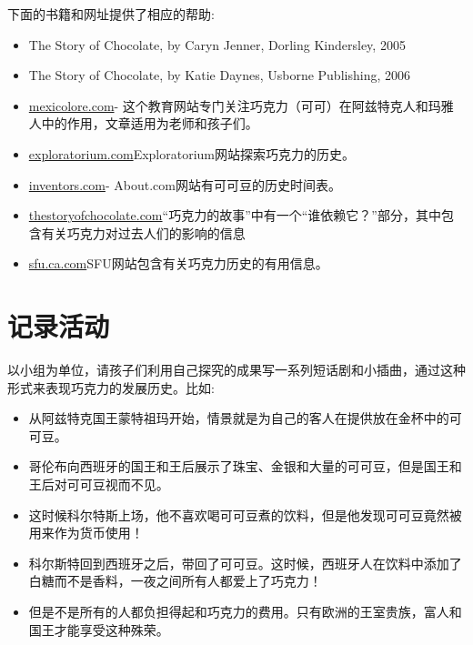    下面的书籍和网址提供了相应的帮助:\par
   \begin{itemize}
     \item The Story of Chocolate, by Caryn Jenner, Dorling Kindersley, 2005
     \item The Story of Chocolate, by Katie Daynes, Usborne Publishing, 2006
     \item \href{http://mexicolore.co.uk/maya/chocolate/}{mexicolore.com}- 这个教育网站专门关注巧克力（可可）在阿兹特克人和玛雅人中的作用，文章适用为老师和孩子们。
     \item \href{http://www.exploratorium.edu/exploring/exploring_chocolate/choc_2.html}{exploratorium.com}Exploratorium网站探索巧克力的历史。
     \item \href{http://www.inventors.about.com/od/foodrelatedinventions/a/chocolate.htm}{inventors.com}- About.com网站有可可豆的历史时间表。 
     \item \href{http://www.thestoryofchocolate.com}{thestoryofchocolate.com}“巧克力的故事”中有一个“谁依赖它？”部分，其中包含有关巧克力对过去人们的影响的信息
     \item \href{http://www.sfu.ca/geog351fall03/groups-webpages/gp8/history/history.html}{sfu.ca.com}SFU网站包含有关巧克力历史的有用信息。
   \end{itemize}  
   

\section{记录活动}
     以小组为单位，请孩子们利用自己探究的成果写一系列短话剧和小插曲，通过这种形式来表现巧克力的发展历史。比如:   \par

     \begin{itemize}
       \item  从阿兹特克国王蒙特祖玛开始，情景就是为自己的客人在提供放在金杯中的可可豆。
       \item  哥伦布向西班牙的国王和王后展示了珠宝、金银和大量的可可豆，但是国王和王后对可可豆视而不见。
       \item  这时候科尔特斯上场，他不喜欢喝可可豆煮的饮料，但是他发现可可豆竟然被用来作为货币使用！
       \item  科尔斯特回到西班牙之后，带回了可可豆。这时候，西班牙人在饮料中添加了白糖而不是香料，一夜之间所有人都爱上了巧克力！
       \item  但是不是所有的人都负担得起和巧克力的费用。只有欧洲的王室贵族，富人和国王才能享受这种殊荣。
     \end{itemize}  

